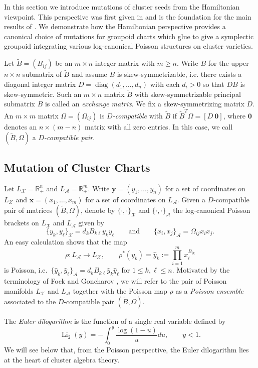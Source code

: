 \documentclass{amsart}
\numberwithin{equation}{section}
\newcommand{\bfx}{\mathbf{x}}
\newcommand{\bfy}{\mathbf{y}}
\newcommand{\cA}{\mathcal{A}}
\newcommand{\cX}{\mathcal{X}}
\newcommand{\RR}{\mathbb{R}}
\newcommand{\diag}{\operatorname{diag}}
\newcommand{\Li}{\operatorname{Li}}
\begin{document}
In this section we introduce mutations of cluster seeds from the Hamiltonian viewpoint.
This perspective was first given in \cite{MR2470108} and is the foundation for the main results of \cite{MR3691969}.
We demonstrate how the Hamiltonian perspective provides a canonical choice of mutations for groupoid charts which glue to give a symplectic groupoid integrating various log-canonical Poisson structures on cluster varieties.

Let $\tilde B=(B_{ij})$ be an $m\times n$ integer matrix with $m\ge n$.  
Write $B$ for the upper $n\times n$ submatrix of $\tilde B$ and assume $B$ is skew-symmetrizable, i.e. there exists a diagonal integer matrix $D=\diag(d_1,\ldots,d_n)$ with each $d_i>0$ so that $DB$ is skew-symmetric. 
Such an $m\times n$ matrix $\tilde B$ with skew-symmetrizable principal submatrix $B$ is called an \emph{exchange matrix}.
We fix a skew-symmetrizing matrix $D$.
An $m\times m$ matrix $\Omega=(\Omega_{ij})$ is \emph{$D$-compatible} with $\tilde B$ if $\tilde B^T\Omega=[D\ \boldsymbol{0}]$, where $\boldsymbol{0}$ denotes an $n\times(m-n)$ matrix with all zero entries.
In this case, we call $(\tilde B,\Omega)$ a \emph{$D$-compatible pair}.

\subsection{Mutation of Cluster Charts}
Let $L_\cX=\RR_+^n$ and $L_\cA=\RR_+^m$.
Write $\bfy=(y_1,\ldots,y_n)$ for a set of coordinates on $L_\cX$ and $\bfx=(x_1,\ldots,x_m)$ for a set of coordinates on $L_\cA$.
Given a $D$-compatible pair of matrices $(\tilde B,\Omega)$, denote by $\{\cdot,\cdot\}_\cX$ and $\{\cdot,\cdot\}_\cA$ the log-canonical Poisson brackets on $L_\cX$ and $L_\cA$ given by
\begin{equation}
  \label{eq:brackets}
  \{y_k,y_\ell\}_\cX=d_kB_{k\ell}y_ky_\ell\qquad\text{and}\qquad\{x_i,x_j\}_\cA=\Omega_{ij}x_ix_j.
\end{equation}
An easy calculation shows that the map
\[\rho:L_\cA\to L_\cX,\qquad \rho^*(y_k)=\hat y_k:=\prod_{i=1}^m x_i^{B_{ik}}\]
is Poisson, i.e.\ $\{\hat y_k,\hat y_\ell\}_\cA=d_kB_{k\ell}\hat y_k\hat y_\ell$ for $1\le k,\ell\le n$.
Motivated by the terminology of Fock and Goncharov \cite{???}, we will refer to the pair of Poisson manifolds $L_\cX$ and $L_\cA$ together with the Poisson map $\rho$ as a \emph{Poisson ensemble} associated to the $D$-compatible pair $(\tilde B,\Omega)$.

The \emph{Euler dilogarithm} is the function of a single real variable defined by
\[\Li_2(y)=-\int_0^y \frac{\log(1-u)}{u}du,\qquad y<1.\]
We will see below that, from the Poisson perspective, the Euler dilogarithm lies at the heart of cluster algebra theory.
\end{document}
